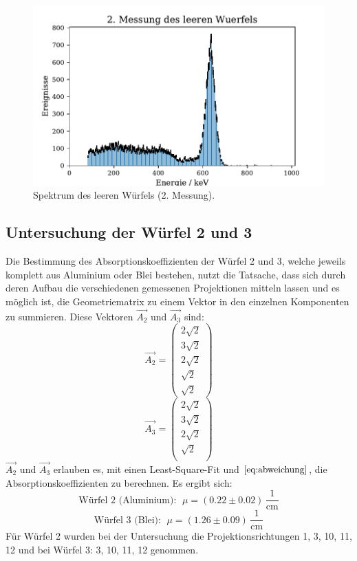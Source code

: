\begin{figure}[H]
  \centering
  \includegraphics{plots/Alu_leer2.pdf}
  \caption{Spektrum des leeren Würfels (2. Messung).}
  \label{Alukasten2}
\end{figure}
\subsection{Untersuchung der Würfel 2 und 3}
Die Bestimmung des Absorptionskoeffizienten der Würfel 2 und 3, welche jeweils komplett aus Aluminium oder Blei bestehen, nutzt die Tatsache, dass sich durch deren Aufbau die verschiedenen gemessenen Projektionen mitteln lassen
und es möglich ist, die Geometriematrix zu einem Vektor in den einzelnen Komponenten zu summieren. Diese Vektoren $\vec{A_2}$ und $\vec{A_3}$ sind:
\begin{equation}
	\vec{A_2}=
	\begin{pmatrix}
		2\sqrt{2} \\
		3\sqrt{2} \\
		2\sqrt{2} \\
		\sqrt{2}\\
    \sqrt{2}
	\end{pmatrix}
\end{equation}
\begin{equation}
	\vec{A_3}=
	\begin{pmatrix}
		2\sqrt{2} \\
		3\sqrt{2} \\
		2\sqrt{2} \\
		\sqrt{2}\\
	\end{pmatrix}
\end{equation}
$\vec{A_2}$ und $\vec{A_3}$ erlauben es, mit einen Least-Square-Fit und $\ref{eq:abweichung}$, die Absorptionskoeffizienten zu berechnen.
\clearpage
Es ergibt sich:
\begin{equation*}
  \text{Würfel 2 (Aluminium): }\; \mu = (0.22 \pm 0.02) \, \frac{1}{\si{\centi\meter}}
\end{equation*}
\begin{equation*}
  \text{Würfel 3 (Blei): } \; \mu = (1.26 \pm 0.09) \, \frac{1}{\si{\centi\meter}}
\end{equation*}
Für Würfel 2 wurden bei der Untersuchung die Projektionsrichtungen 1, 3, 10, 11, 12 und bei Würfel 3: 3, 10, 11, 12 genommen.
